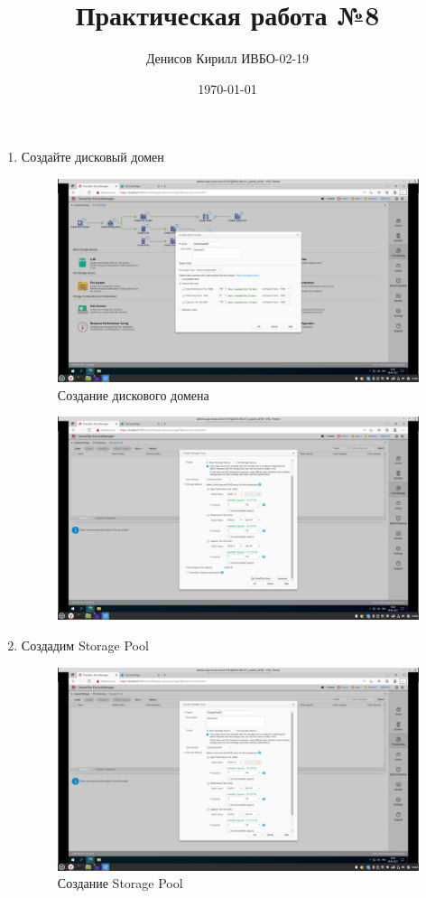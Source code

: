 \documentclass[a4paper,14pt]{extarticle}
\author{Денисов Кирилл ИВБО-02-19}
\title{Практическая работа №8}
\date{\today}
\begin{document}
	\maketitle
	
\begin{enumerate}
\item Создайте дисковый домен	
	
\begin{figure}[h!]
	\centering
	\includegraphics[width=0.7\linewidth]{"images/7/Снимок экрана от 2022-04-06 16-43-54"}
	\caption{Создание дискового домена}
	\label{fig:---2022-04-06-16-43-54}
\end{figure}
\begin{figure}[h!]
	\centering
	\includegraphics[width=0.7\linewidth]{"images/7/Снимок экрана от 2022-04-06 16-45-59"}
	\caption{}
	\label{fig:---2022-04-06-16-45-59}
\end{figure}

\item Создадим Storage Pool

\begin{figure}[h!]
	\centering
	\includegraphics[width=0.7\linewidth]{"images/7/Снимок экрана от 2022-04-06 16-45-55"}
	\caption{Создание Storage Pool}
	\label{fig:---2022-04-06-16-45-55}
\end{figure}


\end{enumerate}
\end{document}
